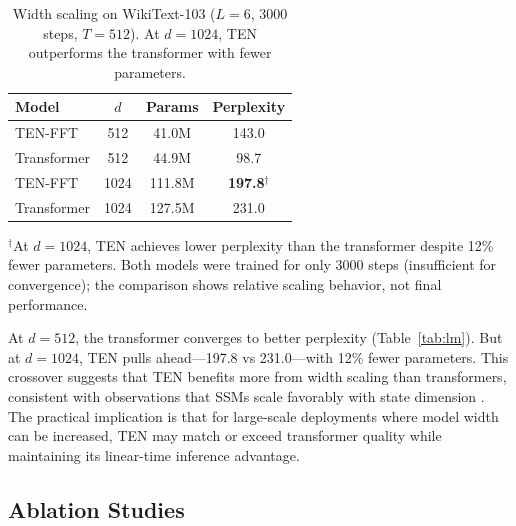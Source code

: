 \documentclass{article}
\begin{document}
\begin{table}[h]
\centering
\caption{Width scaling on WikiText-103 ($L = 6$, 3000 steps, $T = 512$). At $d = 1024$, TEN outperforms the transformer with fewer parameters.}
\label{tab:scaling}
\begin{tabular}{lccc}
\toprule
Model & $d$ & Params & Perplexity \\
\midrule
TEN-FFT & 512 & 41.0M & 143.0 \\
Transformer & 512 & 44.9M & 98.7 \\
\midrule
TEN-FFT & 1024 & 111.8M & \textbf{197.8}$^\dagger$ \\
Transformer & 1024 & 127.5M & 231.0 \\
\bottomrule
\end{tabular}

\vspace{2mm}
\footnotesize{$^\dagger$At $d = 1024$, TEN achieves lower perplexity than the transformer despite 12\% fewer parameters. Both models were trained for only 3000 steps (insufficient for convergence); the comparison shows relative scaling behavior, not final performance.}
\end{table}

At $d = 512$, the transformer converges to better perplexity (Table~\ref{tab:lm}). But at $d = 1024$, TEN pulls ahead---197.8 vs 231.0---with 12\% fewer parameters. This crossover suggests that TEN benefits more from width scaling than transformers, consistent with observations that SSMs scale favorably with state dimension \cite{gu2023mamba}. The practical implication is that for large-scale deployments where model width can be increased, TEN may match or exceed transformer quality while maintaining its linear-time inference advantage.

\subsection{Ablation Studies}
\end{document}
